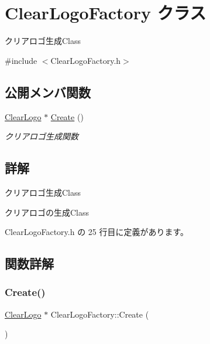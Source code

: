 \hypertarget{class_clear_logo_factory}{}\section{Clear\+Logo\+Factory クラス}
\label{class_clear_logo_factory}


クリアロゴ生成\+Class  




{\ttfamily \#include $<$Clear\+Logo\+Factory.\+h$>$}

\subsection*{公開メンバ関数}
\begin{DoxyCompactItemize}
\item 
\mbox{\hyperlink{class_clear_logo}{Clear\+Logo}} $\ast$ \mbox{\hyperlink{class_clear_logo_factory_ad41a9ebf6d607f497f62290d07c987b0}{Create}} ()
\begin{DoxyCompactList}\small\item\em クリアロゴ生成関数 \end{DoxyCompactList}\end{DoxyCompactItemize}


\subsection{詳解}
クリアロゴ生成\+Class 

クリアロゴの生成\+Class 

 Clear\+Logo\+Factory.\+h の 25 行目に定義があります。



\subsection{関数詳解}
\mbox{\label{class_clear_logo_factory_ad41a9ebf6d607f497f62290d07c987b0}} 
\subsubsection{\texorpdfstring{Create()}{Create()}}
{\footnotesize\ttfamily \mbox{\hyperlink{class_clear_logo}{Clear\+Logo}} $\ast$ Clear\+Logo\+Factory\+::\+Create (\begin{DoxyParamCaption}{ }\end{DoxyParamCaption})}



